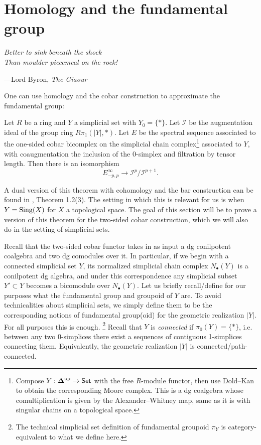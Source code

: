 \section{Homology and the fundamental group}\label{chapter:stallings}
\epigraph{\emph{Better to sink beneath the shock \\
Than moulder piecemeal on the rock!}}{---Lord Byron, \emph{The Giaour}}

One can use homology and the cobar construction to approximate the fundamental group:
\begin{thm}\label{thm:stallings}
    Let $R$ be a ring and $Y$ a simplicial set with $Y_0 = \{*\}$. Let $\mathcal{I}$ be the augmentation ideal of the group ring $R\pi_1(|Y|, *)$. Let $E$ be the spectral sequence associated to the one-sided cobar bicomplex on the simplicial chain complex\footnote{ Compose $Y: \boldsymbol{\Delta}^{\mathrm{op}} \to \mathsf{Set}$ with the free $R$-module functor, then use Dold--Kan to obtain the corresponding Moore complex. This is a dg coalgebra whose comultiplication is given by the Alexander--Whitney map, same as it is with singular chains on a topological space.} associated to $Y$, with coaugmentation the inclusion of the 0-simplex and filtration by tensor length. Then there is an isomorphism
    \[E^\infty_{-p,p} \to \mathcal{I}^p/\mathcal{I}^{p+1}.\]
\end{thm}
\noindent A dual version of this theorem with cohomology and the bar construction can be found in \cite{gadish_letterbraiding}, Theorem 1.2(3). The setting in which this is relevant for us is when $Y = \operatorname{Sing}(X)$ for $X$ a topological space. The goal of this section will be to prove a version of this theorem for the two-sided cobar construction, which we will also do in the setting of simplicial sets. 

Recall that the two-sided cobar functor takes in as input a dg conilpotent coalgebra and two dg comodules over it. In particular, if we begin with a connected simplicial set $Y$, its normalized simplicial chain complex $N_\bullet(Y)$ is a conilpotent dg algebra, and under this correspondence any simplicial subset $Y' \subset Y$ becomes a bicomodule over $N_\bullet(Y)$. Let us briefly recall/define for our purposes what the fundamental group and groupoid of $Y$ are. To avoid technicalities about simplicial sets, we simply define them to be the corresponding notions of fundamental group(oid) for the geometric realization $|Y|$. For all purposes this is enough. \footnote{The technical simplicial set definition of fundamental groupoid $\pi_Y$ is category-equivalent to what we define here.} Recall that $Y$ is \emph{connected} if $\pi_0(Y) = \{*\}$, i.e. between any two 0-simplices there exist a sequences of contiguous 1-simplices connecting them. Equivalently, the geometric realization $|Y|$ is connected/path-connected.

